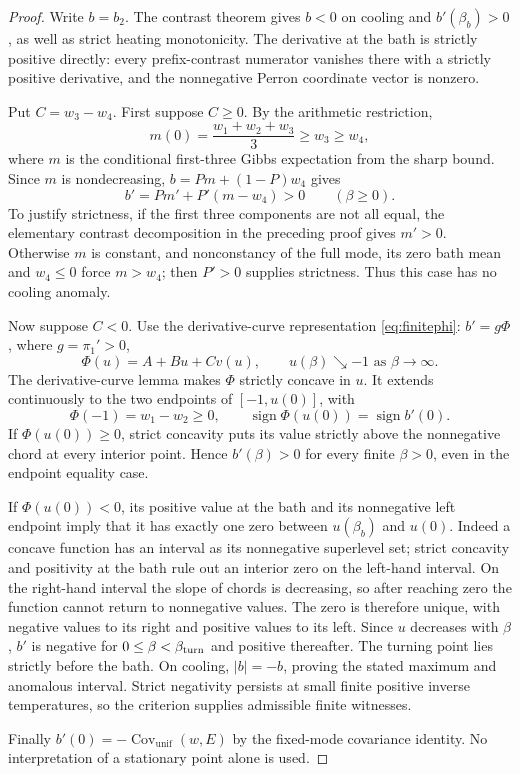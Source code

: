 \documentclass[11pt]{article}
\begin{document}
\begin{proof}
Write $b=b_2$. The contrast theorem gives $b<0$ on cooling and
$b'(\beta_b)>0$, as well as strict heating monotonicity. The derivative
at the bath is strictly positive directly: every prefix-contrast numerator
vanishes there with a strictly positive derivative, and the nonnegative
Perron coordinate vector is nonzero.

Put $C=w_3-w_4$. First suppose $C\geq0$. By the arithmetic restriction,
\[
m(0)=\frac{w_1+w_2+w_3}{3}\geq w_3\geq w_4,
\]
where $m$ is the conditional first-three Gibbs expectation from the sharp
bound. Since $m$ is nondecreasing, $b=Pm+(1-P)w_4$ gives
\[
b'=Pm'+P'(m-w_4)>0 \qquad (\beta\geq0).
\]
To justify strictness, if the first three components are not all equal,
the elementary contrast decomposition in the preceding proof gives
$m'>0$. Otherwise $m$ is constant, and nonconstancy of the full mode,
its zero bath mean and $w_4\leq0$ force $m>w_4$; then $P'>0$ supplies
strictness. Thus this case has no cooling anomaly.

Now suppose $C<0$. Use the derivative-curve representation
\eqref{eq:finitephi}: $b'=g\Phi$, where $g=\pi_1'>0$,
\[
\Phi(u)=A+Bu+C v(u),\qquad
u(\beta)\searrow-1 \text{ as }\beta\to\infty.
\]
The derivative-curve lemma makes $\Phi$ strictly concave in $u$.
It extends continuously to the two endpoints of
$[-1,u(0)]$, with
\[
\Phi(-1)=w_1-w_2\geq0,
\qquad \operatorname{sign}\Phi(u(0))=\operatorname{sign}b'(0).
\]
If $\Phi(u(0))\geq0$, strict concavity puts its value strictly above the
nonnegative chord at every interior point. Hence $b'(\beta)>0$ for every
finite $\beta>0$, even in the endpoint equality case.

If $\Phi(u(0))<0$, its positive value at the bath and its nonnegative
left endpoint imply that it has exactly one zero between $u(\beta_b)$
and $u(0)$. Indeed a concave function has an interval as its nonnegative
superlevel set; strict concavity and positivity at the bath rule out an
interior zero on the left-hand interval. On the right-hand interval the
slope of chords is decreasing, so after reaching zero the function cannot
return to nonnegative values. The zero is therefore unique, with negative
values to its right and positive values to its left. Since $u$ decreases
with $\beta$, $b'$ is negative for $0\leq\beta<\beta_{\rm turn}$ and
positive thereafter. The turning point lies strictly before the bath.
On cooling, $|b|=-b$, proving the stated maximum and anomalous interval.
Strict negativity persists at small finite positive inverse temperatures,
so the criterion supplies admissible finite witnesses.

Finally $b'(0)=-\operatorname{Cov}_{\mathrm{unif}}(w,E)$ by the fixed-mode
covariance identity. No interpretation of a stationary point alone is used.
\end{proof}
\end{document}
